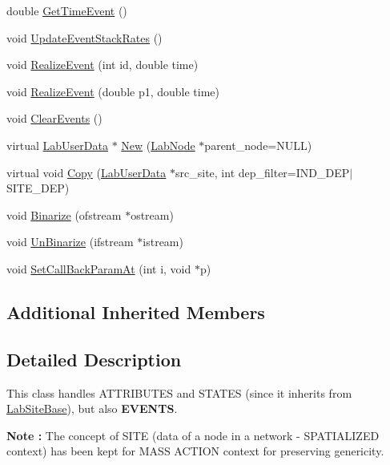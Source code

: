 \begin{DoxyCompactItemize}
double \hyperlink{classelps_1_1_lab_site_event_add4dbc769c1819b90f89bb4aea07aaca}{Get\+Time\+Event} ()
\item 
void \hyperlink{classelps_1_1_lab_site_event_a0ff5037542e555f180c77b4e7f65ae8e}{Update\+Event\+Stack\+Rates} ()
\item 
void \hyperlink{classelps_1_1_lab_site_event_a16b450295e4a6b606c9b396b847d52fe}{Realize\+Event} (int id, double time)
\item 
void \hyperlink{classelps_1_1_lab_site_event_af24df03cf24cd82f61a3b087da569657}{Realize\+Event} (double p1, double time)
\item 
void \hyperlink{classelps_1_1_lab_site_event_a3d016ec3ede26bdb559b80dcebb09daa}{Clear\+Events} ()
\item 
virtual \hyperlink{classelps_1_1_lab_user_data}{Lab\+User\+Data} $\ast$ \hyperlink{classelps_1_1_lab_site_event_a3b0a1f662ad925a9d6ca4fef1d3a21be}{New} (\hyperlink{classelps_1_1_lab_node}{Lab\+Node} $\ast$parent\+\_\+node=N\+U\+L\+L)
\item 
virtual void \hyperlink{classelps_1_1_lab_site_event_a81368b772b6ef46286ce9b42169466c0}{Copy} (\hyperlink{classelps_1_1_lab_user_data}{Lab\+User\+Data} $\ast$src\+\_\+site, int dep\+\_\+filter=I\+N\+D\+\_\+\+D\+E\+P$\vert$S\+I\+T\+E\+\_\+\+D\+E\+P)
\item 
void \hyperlink{classelps_1_1_lab_site_event_af4220ab0bbcf208e73b073a73a77c076}{Binarize} (ofstream $\ast$ostream)
\item 
void \hyperlink{classelps_1_1_lab_site_event_a237da73d8796cbff70f66d953fbe4c2c}{Un\+Binarize} (ifstream $\ast$istream)
\item 
void \hyperlink{classelps_1_1_lab_site_event_ab4f5b42fbd2e9b8dc0507e2656b73c05}{Set\+Call\+Back\+Param\+At} (int i, void $\ast$p)
\end{DoxyCompactItemize}
\subsection*{Additional Inherited Members}


\subsection{Detailed Description}
This class handles A\+T\+T\+R\+I\+B\+U\+T\+E\+S and S\+T\+A\+T\+E\+S (since it inherits from \hyperlink{classelps_1_1_lab_site_base}{Lab\+Site\+Base}), but also {\bfseries E\+V\+E\+N\+T\+S}.

{\bfseries Note \+:} The concept of S\+I\+T\+E (data of a node in a network -\/ S\+P\+A\+T\+I\+A\+L\+I\+Z\+E\+D context) has been kept for M\+A\+S\+S A\+C\+T\+I\+O\+N context for preserving genericity.

